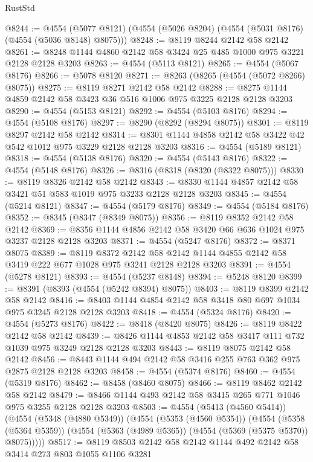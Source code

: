\begin{lexlean}{RustStd}
\begin{coremodule}
@8244 := @4554 (@5077 @8121) (@4554 (@5026 @8204) (@4554 (@5031 @8176) (@4554 (@5036 @8148) @8075)))
@8248 := @8119 @8244 @2142 @58 @2142
@8261 := @8248 @1144 @4860 @2142 @58 @3424 @25 @485 @1000 @975 @3221 @2128 @2128 @3203
@8263 := @4554 (@5113 @8121)
@8265 := @4554 (@5067 @8176)
@8266 := @5078 @8120
@8271 := @8263 (@8265 (@4554 (@5072 @8266) @8075))
@8275 := @8119 @8271 @2142 @58 @2142
@8288 := @8275 @1144 @4859 @2142 @58 @3423 @36 @516 @1006 @975 @3225 @2128 @2128 @3203
@8290 := @4554 (@5153 @8121)
@8292 := @4554 (@5103 @8176)
@8294 := @4554 (@5108 @8176)
@8297 := @8290 (@8292 (@8294 @8075))
@8301 := @8119 @8297 @2142 @58 @2142
@8314 := @8301 @1144 @4858 @2142 @58 @3422 @42 @542 @1012 @975 @3229 @2128 @2128 @3203
@8316 := @4554 (@5189 @8121)
@8318 := @4554 (@5138 @8176)
@8320 := @4554 (@5143 @8176)
@8322 := @4554 (@5148 @8176)
@8326 := @8316 (@8318 (@8320 (@8322 @8075)))
@8330 := @8119 @8326 @2142 @58 @2142
@8343 := @8330 @1144 @4857 @2142 @58 @3421 @51 @583 @1019 @975 @3233 @2128 @2128 @3203
@8345 := @4554 (@5214 @8121)
@8347 := @4554 (@5179 @8176)
@8349 := @4554 (@5184 @8176)
@8352 := @8345 (@8347 (@8349 @8075))
@8356 := @8119 @8352 @2142 @58 @2142
@8369 := @8356 @1144 @4856 @2142 @58 @3420 @66 @636 @1024 @975 @3237 @2128 @2128 @3203
@8371 := @4554 (@5247 @8176)
@8372 := @8371 @8075
@8389 := @8119
    @8372
    @2142
    @58
    @2142
    @1144
    @4855
    @2142
    @58
    @3419
    @222
    @677
    @1028
    @975
    @3241
    @2128
    @2128
    @3203
@8391 := @4554 (@5278 @8121)
@8393 := @4554 (@5237 @8148)
@8394 := @5248 @8120
@8399 := @8391 (@8393 (@4554 (@5242 @8394) @8075))
@8403 := @8119 @8399 @2142 @58 @2142
@8416 := @8403 @1144 @4854 @2142 @58 @3418 @80 @697 @1034 @975 @3245 @2128 @2128 @3203
@8418 := @4554 (@5324 @8176)
@8420 := @4554 (@5273 @8176)
@8422 := @8418 (@8420 @8075)
@8426 := @8119 @8422 @2142 @58 @2142
@8439 := @8426 @1144 @4853 @2142 @58 @3417 @111 @732 @1039 @975 @3249 @2128 @2128 @3203
@8443 := @8119 @8075 @2142 @58 @2142
@8456 := @8443 @1144 @494 @2142 @58 @3416 @255 @763 @362 @975 @2875 @2128 @2128 @3203
@8458 := @4554 (@5374 @8176)
@8460 := @4554 (@5319 @8176)
@8462 := @8458 (@8460 @8075)
@8466 := @8119 @8462 @2142 @58 @2142
@8479 := @8466 @1144 @493 @2142 @58 @3415 @265 @771 @1046 @975 @3255 @2128 @2128 @3203
@8503 := @4554
    (@5413 (@4560 @5414))
    (@4554
      (@5348 (@4880 @5349))
      (@4554
        (@5353 (@4560 @5354))
        (@4554
          (@5358 (@5364 @5359))
          (@4554 (@5363 (@4989 @5365)) (@4554 (@5369 (@5375 @5370)) @8075)))))
@8517 := @8119 @8503 @2142 @58 @2142 @1144 @492 @2142 @58 @3414 @273 @803 @1055 @1106 @3281

\end{coremodule}
\end{lexlean}
